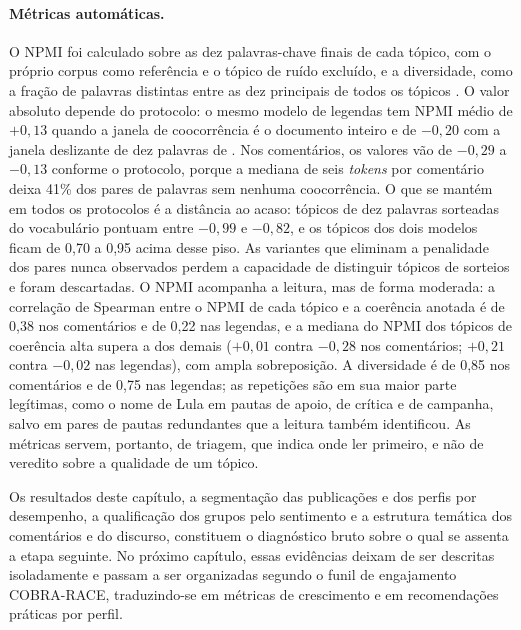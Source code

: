 \paragraph*{Métricas automáticas.} O NPMI foi calculado sobre as dez palavras-chave finais de cada tópico, com o próprio corpus como referência e o tópico de ruído excluído, e a diversidade, como a fração de palavras distintas entre as dez principais de todos os tópicos \cite{dieng2020}. O valor absoluto depende do protocolo: o mesmo modelo de legendas tem NPMI médio de $+0{,}13$ quando a janela de coocorrência é o documento inteiro e de $-0{,}20$ com a janela deslizante de dez palavras de . Nos comentários, os valores vão de $-0{,}29$ a $-0{,}13$ conforme o protocolo, porque a mediana de seis \emph{tokens} por comentário deixa 41\% dos pares de palavras sem nenhuma coocorrência. O que se mantém em todos os protocolos é a distância ao acaso: tópicos de dez palavras sorteadas do vocabulário pontuam entre $-0{,}99$ e $-0{,}82$, e os tópicos dos dois modelos ficam de 0,70 a 0,95 acima desse piso. As variantes que eliminam a penalidade dos pares nunca observados perdem a capacidade de distinguir tópicos de sorteios e foram descartadas. O NPMI acompanha a leitura, mas de forma moderada: a correlação de Spearman entre o NPMI de cada tópico e a coerência anotada é de 0,38 nos comentários e de 0,22 nas legendas, e a mediana do NPMI dos tópicos de coerência alta supera a dos demais ($+0{,}01$ contra $-0{,}28$ nos comentários; $+0{,}21$ contra $-0{,}02$ nas legendas), com ampla sobreposição. A diversidade é de 0,85 nos comentários e de 0,75 nas legendas; as repetições são em sua maior parte legítimas, como o nome de Lula em pautas de apoio, de crítica e de campanha, salvo em pares de pautas redundantes que a leitura também identificou. As métricas servem, portanto, de triagem, que indica onde ler primeiro, e não de veredito sobre a qualidade de um tópico.

Os resultados deste capítulo, a segmentação das publicações e dos perfis por desempenho, a qualificação dos grupos pelo sentimento e a estrutura temática dos comentários e do discurso, constituem o diagnóstico bruto sobre o qual se assenta a etapa seguinte. No próximo capítulo, essas evidências deixam de ser descritas isoladamente e passam a ser organizadas segundo o funil de engajamento COBRA-RACE, traduzindo-se em métricas de crescimento e em recomendações práticas por perfil.
